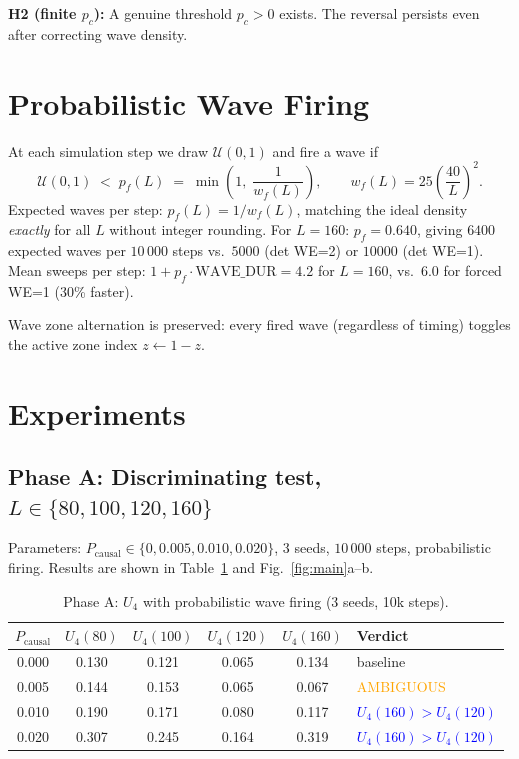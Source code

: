 \documentclass[11pt,a4paper]{article}
\begin{document}
\textbf{H2 (finite $p_c$):} A genuine threshold $p_c>0$ exists.
The reversal persists even after correcting wave density.

\section{Probabilistic Wave Firing}

At each simulation step we draw $\mathcal{U}(0,1)$ and fire a wave if
\begin{equation}
  \mathcal{U}(0,1) \;<\; p_f(L) \;=\; \min\!\left(1,\;\frac{1}{w_f(L)}\right),
  \qquad w_f(L)=25\left(\frac{40}{L}\right)^{\!2}.
\label{eq:prob_fire}
\end{equation}
Expected waves per step: $p_f(L)=1/w_f(L)$, matching the ideal density
\emph{exactly} for all $L$ without integer rounding.
For $L=160$: $p_f=0.640$, giving $6400$ expected waves per $10\,000$ steps
vs.\ $5000$ (det WE=2) or $10000$ (det WE=1).
Mean sweeps per step: $1+p_f\cdot\mathrm{WAVE\_DUR}=4.2$ for $L=160$,
vs.\ $6.0$ for forced WE=1 (30\% faster).

Wave zone alternation is preserved: every fired wave (regardless of timing)
toggles the active zone index $z\leftarrow 1-z$.

\section{Experiments}

\subsection{Phase A: Discriminating test, $L\in\{80,100,120,160\}$}

Parameters: $P_\text{causal}\in\{0,0.005,0.010,0.020\}$, 3 seeds, $10\,000$
steps, probabilistic firing.
Results are shown in Table~\ref{tab:phaseA} and Fig.~\ref{fig:main}a--b.

\begin{table}[h]
\centering
\caption{Phase A: $U_4$ with probabilistic wave firing (3 seeds, 10k steps).}
\label{tab:phaseA}
\begin{tabular}{cccccl}
\toprule
$P_\text{causal}$ & $U_4(80)$ & $U_4(100)$ & $U_4(120)$ & $U_4(160)$ & Verdict \\
\midrule
0.000 & 0.130 & 0.121 & 0.065 & 0.134 & baseline \\
0.005 & 0.144 & 0.153 & 0.065 & 0.067 & \textcolor{orange}{AMBIGUOUS} \\
0.010 & 0.190 & 0.171 & 0.080 & 0.117 & \textcolor{blue}{$U_4(160)>U_4(120)$} \\
0.020 & 0.307 & 0.245 & 0.164 & 0.319 & \textcolor{blue}{$U_4(160)>U_4(120)$} \\
\bottomrule
\end{tabular}
\end{table}
\end{document}
